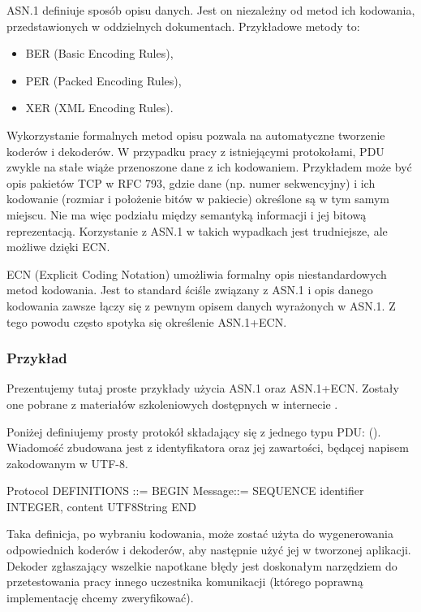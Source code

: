\documentclass[00-praca-magisterska.tex]{subfiles}
\begin{document}
ASN.1 definiuje sposób opisu danych. Jest on niezależny od metod ich kodowania,
przedstawionych w oddzielnych dokumentach. Przykładowe metody to:
\begin{itemize}
\item BER (Basic Encoding Rules),
\item PER (Packed Encoding Rules),
\item XER (XML Encoding Rules).
\end{itemize}

Wykorzystanie formalnych metod opisu pozwala na automatyczne tworzenie koderów i
dekoderów. W przypadku pracy z istniejącymi protokołami, PDU zwykle na stałe
wiąże przenoszone dane z ich kodowaniem. Przykładem może być opis pakietów TCP w
RFC 793, gdzie dane (np. numer sekwencyjny) i ich kodowanie (rozmiar i
położenie bitów w pakiecie) określone są w tym samym miejscu. Nie ma więc
podziału między semantyką informacji i jej bitową reprezentacją. Korzystanie z
ASN.1 w takich wypadkach jest trudniejsze, ale możliwe dzięki ECN.

ECN (Explicit Coding Notation) umożliwia formalny opis niestandardowych metod
kodowania. Jest to standard ściśle związany z ASN.1 i opis danego kodowania
zawsze łączy się z pewnym opisem danych wyrażonych w ASN.1. Z tego powodu często
spotyka się określenie ASN.1+ECN.

\subsubsection{Przykład}

Prezentujemy tutaj proste przykłady użycia ASN.1 oraz ASN.1+ECN. Zostały one
pobrane z materiałów szkoleniowych dostępnych w internecie \cite{asn1-main,ecn-tutorial1,ecn-tutorial2,ecn-tutorial3}.

Poniżej definiujemy prosty protokół składający się z jednego typu PDU:
(). Wiadomość zbudowana jest z identyfikatora oraz jej
zawartości, będącej napisem zakodowanym w UTF-8.

\begin{textcode}
  Protocol DEFINITIONS ::= BEGIN
       Message::= SEQUENCE {
          identifier INTEGER,
          content    UTF8String
      }
  END
\end{textcode}

Taka definicja, po wybraniu kodowania, może zostać użyta do wygenerowania
odpowiednich koderów i dekoderów, aby następnie użyć jej w tworzonej aplikacji.
Dekoder zgłaszający wszelkie napotkane błędy jest doskonałym narzędziem do
przetestowania pracy innego uczestnika komunikacji (którego poprawną
implementację chcemy zweryfikować).
\end{document}
